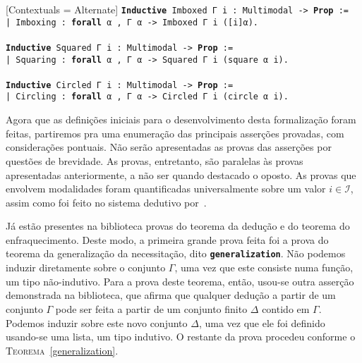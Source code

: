 \vspace{0.5\baselineskip}
\begin{tcolorbox}[enhanced jigsaw, breakable, sharp corners, colframe=black, colback=white, boxrule=0.5pt, left=1.5mm, right=1.5mm, top=1.5mm, bottom=1.5mm]
\setmonofont{Fira Code}[Contextuals = Alternate]
\noindent
\texttt
{\noindent\footnotesize\textbf{Inductive} Imboxed Γ i : Multimodal -> \textbf{Prop} :=\\
| Imboxing : \textbf{forall} α , Γ α  -> Imboxed Γ i ([i]α).
\\
\\
\textbf{Inductive} Squared Γ i : Multimodal -> \textbf{Prop} :=\\
| Squaring : \textbf{forall} α , Γ α  -> Squared Γ i (square α i).
\\
\\
\textbf{Inductive} Circled Γ i : Multimodal -> \textbf{Prop} :=\\
| Circling : \textbf{forall} α , Γ α  -> Circled Γ i (circle α i).
}
\end{tcolorbox}

\vspace{0.5\baselineskip}
Agora que as definições iniciais para o desenvolvimento desta formalização foram feitas, partiremos pra uma enumeração das principais asserções provadas, com considerações pontuais.
Não serão apresentadas as provas das asserções por questões de brevidade.
As provas, entretanto, são paralelas às provas apresentadas anteriormente, a não ser quando destacado o oposto.
As provas que envolvem modalidades foram quantificadas universalmente sobre um valor $i\in\mathcal{I}$, assim como foi feito no sistema dedutivo por~\cite{Nunes+others.2025}.

\vspace{0.5\baselineskip}
Já estão presentes na biblioteca provas do teorema da dedução e do teorema do enfraquecimento.
Deste modo, a primeira grande prova feita foi a prova do teorema da generalização da necessitação, dito \texttt{\textbf{generalization}}.
Não podemos induzir diretamente sobre o conjunto $\Gamma$, uma vez que este consiste numa função, um tipo não-indutivo.
Para a prova deste teorema, então, usou-se outra asserção demonstrada na biblioteca, que afirma que qualquer dedução a partir de um conjunto $\Gamma$ pode ser feita a partir de um conjunto finito $\Delta$ contido em $\Gamma$.
Podemos induzir sobre este novo conjunto $\Delta$, uma vez que ele foi definido usando-se uma lista, um tipo indutivo.
O restante da prova procedeu conforme o \textsc{Teorema}~\ref{generalization}.

